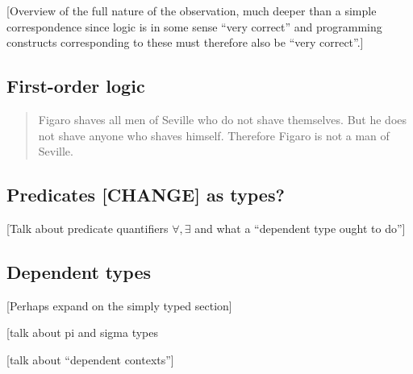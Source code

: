 [Overview of the full nature of the observation, much deeper than a simple correspondence since logic is in some sense ``very correct'' and programming constructs corresponding to these must therefore also be ``very correct''.]

\subsection{First-order logic}


\begin{quotation}
    Figaro shaves all men of Seville who do not shave themselves.
    But he does not shave anyone who shaves himself.
    Therefore Figaro is not a man of Seville.
\end{quotation}

\subsection{Predicates [CHANGE] as types?}

[Talk about predicate quantifiers $\forall, \exists$ and what a ``dependent type ought to do'']

\subsection{Dependent types}


[Perhaps expand on the simply typed section]

[talk about pi and sigma types

[talk about ``dependent contexts'']


